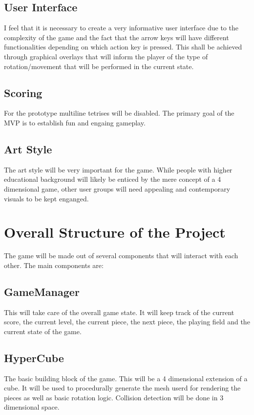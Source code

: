 \documentclass{article}
\begin{document}
\subsection{User Interface}
I feel that it is necessary to create a very informative user interface due to the complexity of the game and the fact that the arrow keys will have different functionalities depending on which action key is pressed. This shall be achieved through graphical overlays that will inform the player of the type of rotation/movement that will be performed in the current state.
\subsection{Scoring}
For the prototype multiline tetrises will be disabled. The primary goal of the MVP is to establish fun and engaing gameplay.
\subsection{Art Style}
The art style will be very important for the game. While people with higher educational background will likely be enticed by the mere concept of a 4 dimensional game, other user groups will need appealing and contemporary visuals to be kept enganged.



\section{Overall Structure of the Project}
The game will be made out of several components that will interact with each other. The main components are:
\subsection{GameManager}
This will take care of the overall game state. It will keep track of the current score, the current level, the current piece, the next piece, the playing field and the current state of the game. 
\subsection{HyperCube}
The basic building block of the game. This will be a 4 dimensional extension of a cube. It will be used to procedurally generate the mesh userd for rendering the pieces as well as basic rotation logic. Collision detection will be done in 3 dimensional space.
\end{document}
